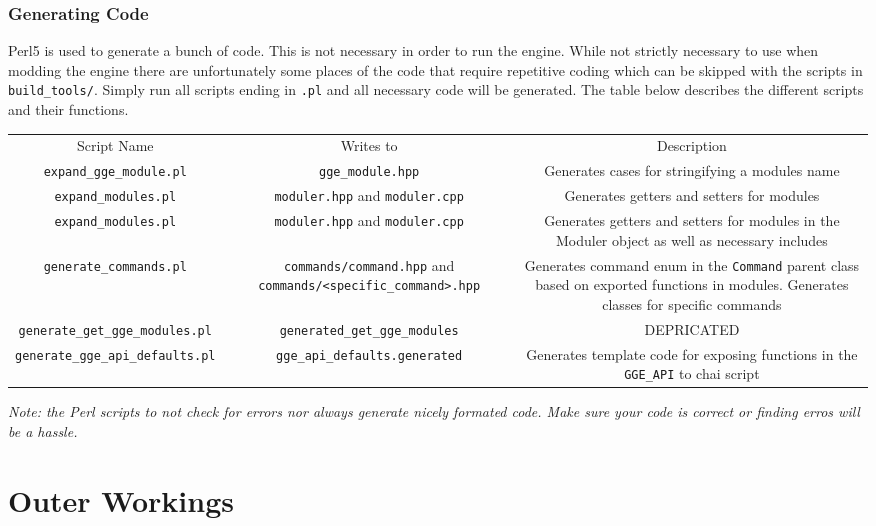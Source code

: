 \documentclass{article}
\begin{document}
\section{Generating Code}
Perl5 is used to generate a bunch of code. This is not necessary in order to run the engine. 
While not strictly necessary to use when modding the engine there are unfortunately some places of the code that
require repetitive coding which can be skipped with the scripts in \verb|build_tools/|.
Simply run all scripts ending in \verb|.pl| and all necessary code will be generated. 
The table below describes the different scripts and their functions.

\begin{adjustbox}{width=\paperwidth}
\begin{tabular}{|c|c|c|}
	Script Name & Writes to & Description \\
	\verb|expand_gge_module.pl| & \verb|gge_module.hpp| & Generates cases for stringifying a modules name \\
	\verb|expand_modules.pl| & \verb|moduler.hpp| and \verb|moduler.cpp| & 
	Generates getters and setters for modules \\
	\verb|expand_modules.pl| & \verb|moduler.hpp| and \verb|moduler.cpp| & 
	Generates getters and setters for modules in the Moduler object as well as necessary includes \\
	\verb|generate_commands.pl| & \verb|commands/command.hpp| and \verb|commands/<specific_command>.hpp| & 
	Generates command enum in the \verb|Command| parent class based on exported functions in modules. 
	Generates classes for specific commands\\
	\verb|generate_get_gge_modules.pl| & \verb|generated_get_gge_modules| & 
	DEPRICATED \\
	\verb|generate_gge_api_defaults.pl| & \verb|gge_api_defaults.generated| & 
	Generates template code for exposing functions in the \verb|GGE_API| to chai script \\
\end{tabular}
\end{adjustbox}

\textit{
	Note: the Perl scripts to not check for errors nor always generate nicely formated code.
	Make sure your code is correct or finding erros will be a hassle.
}

\part{Outer Workings}
\end{document}
